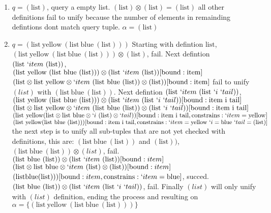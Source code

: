 \documentclass[11pt,a4paper]{report}
\newcommand{\var}[1]{`#1}
\newcommand{\unify}{\otimes}
\begin{document}
\begin{enumerate}
\item $q = (\text{list})$, query a empty list.
\subitem $(\text{list}) \unify (\text{list}) = (\text{list})$
\subitem all other definitions fail to unify because the number of elements in remainding defintions dont match query tuple.
\subitem $\alpha = {(\text{list})}$
\item $q = (\text{list}\ \text{yellow}\ (\text{list}\ \text{blue}\ (\text{list})))$
\subitem Starting with defintion $\text{list}$,
\subitem $(\text{list}\ \text{yellow}\ (\text{list}\ \text{blue}\ (\text{list}))) \unify (\text{list})$, fail.
\subitem Next defintion $(\text{list}\ \var{item}\ (\text{list}))$,
\subitem $(\text{list}\ \text{yellow}\ (\text{list}\ \text{blue}\ (\text{list}))) \unify (\text{list}\ \var{item}\ (\text{list}))[\text{bound}: \text{item} ]$
\subitem $(\text{list} \unify \text{list}\ \text{yellow} \unify \var{item}\ (\text{list}\ \text{blue}\ (\text{list})) \unify (\text{list}))[\text{bound}: \text{item}]$
\subitem fail to unify $(list)$ with $(\text{list}\ \text{blue}\ (\text{list}))$.
\subitem Next defintion $(\text{list}\ \var{item}\ (\text{list}\ \var{i}\ \var{tail}))$,
\subitem $(\text{list}\ \text{yellow}\ (\text{list}\ \text{blue}\ (\text{list}))) \unify (\text{list}\ \var{item}\ (\text{list}\ \var{i}\ \var{tail}))[\text{bound}: \text{item}\ \text{i}\ \text{tail}]$
\subitem $(\text{list}\unify \text{list}\ \text{yellow} \unify \var{item}\ (\text{list}\ \text{blue}\ (\text{list})) \unify (\text{list}\ \var{i}\ \var{tail}))[\text{bound}: \text{item}\ \text{i}\ \text{tail}]$
\subitem $(\text{list}\ \text{yellow} (\text{list}\unify \text{list}\ \text{blue} \unify \var{i}\ (\text{list}) \unify \var{tail}))[\text{bound}: \text{item}\ \text{i}\ \text{tail}, \text{constrains}: \var{item} = \text{yellow}]$
\subitem $(\text{list}\ \text{yellow} (\text{list}\ \text{blue}\ (\text{list})))
[\text{bound}: \text{item}\ \text{i}\ \text{tail}, \text{constrains}: \var{item} = \text{yellow}\ \var{i}=\text{blue}\ \var{tail}=(\text{list})]$
\subitem the next step is to unify all sub-tuples that are not yet checked with definitions, this are: $(\text{list}\ \text{blue}\ (\text{list}))$ and $(\text{list}))$,
\subitem $(\text{list}\ \text{blue}\ (\text{list})) \unify (list)$, fail.
\subitem $(\text{list}\ \text{blue}\ (\text{list})) \unify (\text{list}\ \var{item}\ (\text{list}))[\text{bound}: item]$
\subitem $(\text{list}\unify \text{list}\ \text{blue}\unify \var{item}\ (\text{list}) \unify (\text{list}))[\text{bound}: item]$
\subitem $(\text{list} \text{blue} (\text{list})))[\text{bound}: item, \text{constrains}: \var{item}=\text{blue}]$, succed.
\subitem $(\text{list}\ \text{blue}\ (\text{list})) \unify (\text{list}\ \var{item}\ (\text{list}\ \var{i}\ \var{tail}))$, fail.
\subitem Finally $(list)$ will only unify with $(list)$ definition, ending the process and resulting on $\alpha = \{ (\text{list}\ \text{yellow}\ (\text{list}\ \text{blue}\ (\text{list}))) \}$
\end{enumerate}
\end{document}
